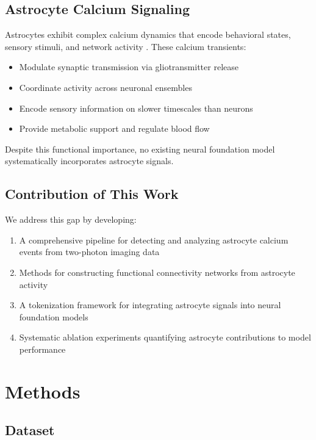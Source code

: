\documentclass[11pt,twocolumn]{article}
\begin{document}
\subsection{Astrocyte Calcium Signaling}

Astrocytes exhibit complex calcium dynamics that encode behavioral states, sensory stimuli, and network activity \citep{wang2006astrocytic, schulz2012simultaneous}. These calcium transients:
\begin{itemize}
    \item Modulate synaptic transmission via gliotransmitter release
    \item Coordinate activity across neuronal ensembles
    \item Encode sensory information on slower timescales than neurons
    \item Provide metabolic support and regulate blood flow
\end{itemize}

Despite this functional importance, no existing neural foundation model systematically incorporates astrocyte signals.

\subsection{Contribution of This Work}

We address this gap by developing:
\begin{enumerate}
    \item A comprehensive pipeline for detecting and analyzing astrocyte calcium events from two-photon imaging data
    \item Methods for constructing functional connectivity networks from astrocyte activity
    \item A tokenization framework for integrating astrocyte signals into neural foundation models
    \item Systematic ablation experiments quantifying astrocyte contributions to model performance
\end{enumerate}

\section{Methods}

\subsection{Dataset}
\end{document}
